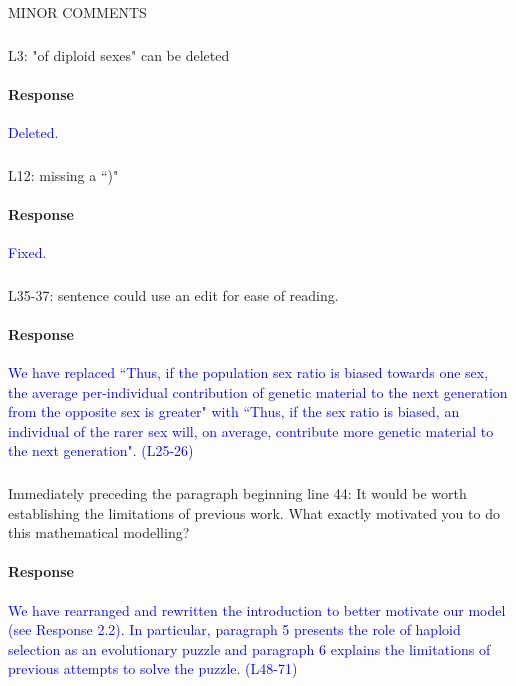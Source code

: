 \documentclass[10pt,letterpaper]{article}
\begin{document}
\subsection{}

MINOR COMMENTS

\noindent\subsubsection{}
L3: "of diploid sexes" can be deleted

\noindent\paragraph{Response}
\textcolor{blue}{Deleted.}

\noindent\subsubsection{}
L12: missing a ``)"

\noindent\paragraph{Response}
\textcolor{blue}{Fixed.}

\noindent\subsubsection{}
L35-37: sentence could use an edit for ease of reading.

\noindent\paragraph{Response}
\textcolor{blue}{We have replaced ``Thus, if the population sex ratio is biased towards one sex, the average per-individual contribution of genetic material to the next generation from the opposite sex is greater" with ``Thus, if the sex ratio is biased, an individual of the rarer sex will, on average, contribute more genetic material to the next generation". (L25-26)}

\noindent\subsubsection{}
Immediately preceding the paragraph beginning line 44: It would be worth establishing the limitations of previous work. What exactly motivated you to do this mathematical modelling?

\noindent\paragraph{Response}
\textcolor{blue}{We have rearranged and rewritten the introduction to better motivate our model (see Response 2.2). In particular, paragraph 5 presents the role of haploid selection as an evolutionary puzzle and paragraph 6 explains the limitations of previous attempts to solve the puzzle. (L48-71)}
\end{document}
